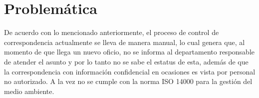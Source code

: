 \section{Problemática}

De acuerdo con lo mencionado anteriormente, el proceso de control de correspondencia actualmente se lleva de manera manual, lo cual genera que, al momento de que llega un nuevo oficio, no se informa al departamento responsable de atender el asunto y por lo tanto no se sabe el estatus de esta, además de que la correspondencia con información confidencial en ocasiones es vista por personal no autorizado. A la vez no se cumple con la norma ISO 14000 para la gestión del medio ambiente.

